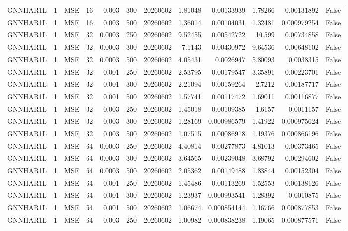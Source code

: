\begin{tabular}{lrlrrrrrrrrr}
GNNHAR1L & 1 & MSE & 16 & 0.003 & 300 & 20260602 & 1.81048 & 0.00133939 & 1.78266 & 0.00131892 & False \\
GNNHAR1L & 1 & MSE & 16 & 0.003 & 500 & 20260602 & 1.36014 & 0.00104031 & 1.32481 & 0.000979254 & False \\
GNNHAR1L & 1 & MSE & 32 & 0.0003 & 250 & 20260602 & 9.52455 & 0.00542722 & 10.599 & 0.00734858 & False \\
GNNHAR1L & 1 & MSE & 32 & 0.0003 & 300 & 20260602 & 7.1143 & 0.00430972 & 9.64536 & 0.00648102 & False \\
GNNHAR1L & 1 & MSE & 32 & 0.0003 & 500 & 20260602 & 4.05431 & 0.0026947 & 5.80093 & 0.0038315 & False \\
GNNHAR1L & 1 & MSE & 32 & 0.001 & 250 & 20260602 & 2.53795 & 0.00179547 & 3.35891 & 0.00223701 & False \\
GNNHAR1L & 1 & MSE & 32 & 0.001 & 300 & 20260602 & 2.21094 & 0.00159264 & 2.7212 & 0.00187717 & False \\
GNNHAR1L & 1 & MSE & 32 & 0.001 & 500 & 20260602 & 1.57741 & 0.00117472 & 1.69011 & 0.00116877 & False \\
GNNHAR1L & 1 & MSE & 32 & 0.003 & 250 & 20260602 & 1.45018 & 0.00109385 & 1.6157 & 0.0011157 & False \\
GNNHAR1L & 1 & MSE & 32 & 0.003 & 300 & 20260602 & 1.28169 & 0.000986579 & 1.41922 & 0.000975624 & False \\
GNNHAR1L & 1 & MSE & 32 & 0.003 & 500 & 20260602 & 1.07515 & 0.00086918 & 1.19376 & 0.000866196 & False \\
GNNHAR1L & 1 & MSE & 64 & 0.0003 & 250 & 20260602 & 4.40814 & 0.00277873 & 4.81013 & 0.00373465 & False \\
GNNHAR1L & 1 & MSE & 64 & 0.0003 & 300 & 20260602 & 3.64565 & 0.00239048 & 3.68792 & 0.00294602 & False \\
GNNHAR1L & 1 & MSE & 64 & 0.0003 & 500 & 20260602 & 2.05362 & 0.00149488 & 1.83844 & 0.00152304 & False \\
GNNHAR1L & 1 & MSE & 64 & 0.001 & 250 & 20260602 & 1.45486 & 0.00113269 & 1.52553 & 0.00138126 & False \\
GNNHAR1L & 1 & MSE & 64 & 0.001 & 300 & 20260602 & 1.23937 & 0.000993541 & 1.28392 & 0.0010875 & False \\
GNNHAR1L & 1 & MSE & 64 & 0.001 & 500 & 20260602 & 1.06674 & 0.000854144 & 1.16766 & 0.000877853 & False \\
GNNHAR1L & 1 & MSE & 64 & 0.003 & 250 & 20260602 & 1.00982 & 0.000838238 & 1.19065 & 0.000877571 & False \\

\end{tabular}
